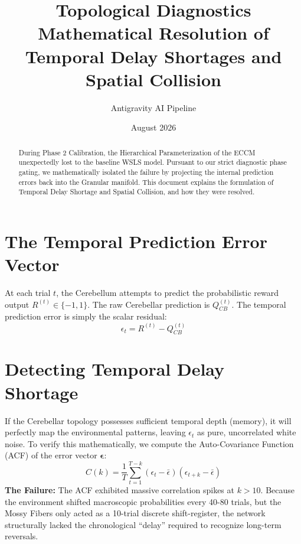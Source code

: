 \documentclass[11pt,a4paper]{article}
\title{\textbf{Topological Diagnostics}\\ \Large Mathematical Resolution of Temporal Delay Shortages and Spatial Collision}
\author{Antigravity AI Pipeline}
\date{August 2026}
\begin{document}
\maketitle

\begin{abstract}
During Phase 2 Calibration, the Hierarchical Parameterization of the ECCM unexpectedly lost to the baseline WSLS model. Pursuant to our strict diagnostic phase gating, we mathematically isolated the failure by projecting the internal prediction errors back into the Granular manifold. This document explains the formulation of Temporal Delay Shortage and Spatial Collision, and how they were resolved.
\end{abstract}

\section{The Temporal Prediction Error Vector}
At each trial $t$, the Cerebellum attempts to predict the probabilistic reward output $R^{(t)} \in \{-1, 1\}$. The raw Cerebellar prediction is $Q_{CB}^{(t)}$. The temporal prediction error is simply the scalar residual:
\begin{equation}
    \epsilon_t = R^{(t)} - Q_{CB}^{(t)}
\end{equation}

\section{Detecting Temporal Delay Shortage}
If the Cerebellar topology possesses sufficient temporal depth (memory), it will perfectly map the environmental patterns, leaving $\epsilon_t$ as pure, uncorrelated white noise. To verify this mathematically, we compute the Auto-Covariance Function (ACF) of the error vector $\boldsymbol{\epsilon}$:
\begin{equation}
    C(k) = \frac{1}{T} \sum_{t=1}^{T-k} (\epsilon_t - \bar{\epsilon})(\epsilon_{t+k} - \bar{\epsilon})
\end{equation}
\textbf{The Failure:} The ACF exhibited massive correlation spikes at $k > 10$. Because the environment shifted macroscopic probabilities every 40-80 trials, but the Mossy Fibers only acted as a 10-trial discrete shift-register, the network structurally lacked the chronological ``delay'' required to recognize long-term reversals.
\end{document}
